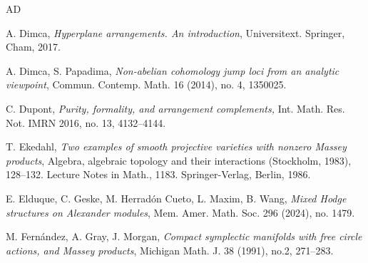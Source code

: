 \documentclass[12pt,leqno,twoside]{amsart}
\theoremstyle{plain}
\theoremstyle{definition}
\begin{document}
\begin{thebibliography}{AD}

 A. Dimca, {\it Hyperplane arrangements. An introduction}, Universitext. Springer, Cham, 2017.  %






 A. Dimca, S. Papadima, {\it Non-abelian cohomology jump loci from an analytic viewpoint}, Commun. Contemp. Math. 16 (2014), no. 4, 1350025.

 C. Dupont, {\it  Purity, formality, and arrangement complements,} 
Int. Math. Res. Not. IMRN 2016, no. 13, 4132--4144.

 T. Ekedahl, {\it Two examples of smooth projective varieties with nonzero Massey products}, Algebra, algebraic topology and their interactions (Stockholm, 1983), 128--132. Lecture Notes in Math., 1183. Springer-Verlag, Berlin, 1986.

E. Elduque, C. Geske, M. Herrad\'on Cueto, L. Maxim, B. Wang, {\it Mixed Hodge structures on Alexander modules}, Mem. Amer. Math. Soc. 296 (2024), no. 1479.




 M. Fern\'andez, A. Gray, J. Morgan, {\it  Compact symplectic manifolds with free circle actions, and Massey products}, Michigan Math. J. 38 (1991), no.2, 271--283.


\end{thebibliography}
\end{document}
